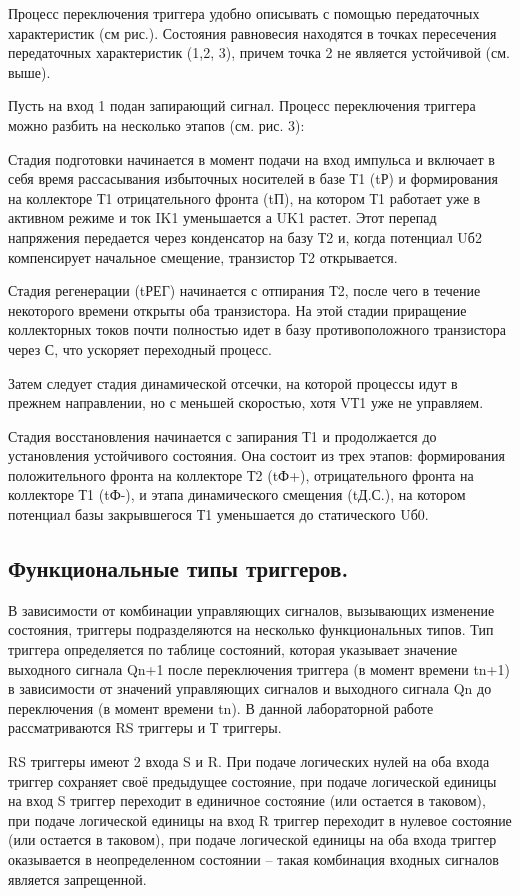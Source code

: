 \documentclass[a4paper,14pt]{article}
\begin{document}
Процесс переключения триггера удобно описывать с помощью передаточных
характеристик (см рис.). Состояния равновесия находятся в точках пересечения
передаточных характеристик (1,2, 3), причем точка 2 не является устойчивой (см. выше).

Пусть на вход 1 подан запирающий сигнал. Процесс переключения триггера можно
разбить на несколько этапов (см. рис. 3):

Стадия подготовки начинается в момент подачи на вход импульса и включает в себя
время рассасывания избыточных носителей в базе Т1 (tР) и формирования на коллекторе Т1
отрицательного фронта (tП), на котором Т1 работает уже в активном режиме и ток IK1
уменьшается а UK1 растет. Этот перепад напряжения передается через конденсатор на базу
Т2 и, когда потенциал Uб2 компенсирует начальное смещение, транзистор Т2 открывается.

Стадия регенерации (tРЕГ) начинается с отпирания Т2, после чего в течение
некоторого времени открыты оба транзистора. На этой стадии приращение коллекторных
токов почти полностью идет в базу противоположного транзистора через С, что ускоряет
переходный процесс.

Затем следует стадия динамической отсечки, на которой процессы идут в прежнем
направлении, но с меньшей скоростью, хотя VТ1 уже не управляем.

Стадия восстановления начинается с запирания Т1 и продолжается до установления
устойчивого состояния. Она состоит из трех этапов: формирования положительного фронта
на коллекторе Т2 (tФ+), отрицательного фронта на коллекторе Т1 (tФ-), и этапа динамического
смещения (tД.С.), на котором потенциал базы закрывшегося Т1 уменьшается до статического
Uб0.

\subsection{Функциональные типы триггеров.}

В зависимости от комбинации управляющих сигналов, вызывающих изменение
состояния, триггеры подразделяются на несколько функциональных типов. Тип триггера
определяется по таблице состояний, которая указывает значение выходного сигнала Qn+1
после переключения триггера (в момент времени tn+1) в зависимости от значений
управляющих сигналов и выходного сигнала Qn до переключения (в момент времени tn). В
данной лабораторной работе рассматриваются RS триггеры и Т триггеры.

RS триггеры имеют 2 входа S и R. При подаче логических нулей на оба входа триггер
сохраняет своё предыдущее состояние, при подаче логической единицы на вход S триггер
переходит в единичное состояние (или остается в таковом), при подаче логической единицы
на вход R триггер переходит в нулевое состояние (или остается в таковом), при подаче
логической единицы на оба входа триггер оказывается в неопределенном состоянии – такая
комбинация входных сигналов является запрещенной.
\end{document}

